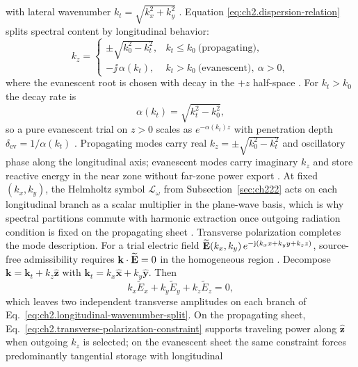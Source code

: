 with lateral wavenumber \(k_t=\sqrt{k_x^2+k_y^2}\) \cite{stratton1941}. Equation
\eqref{eq:ch2.dispersion-relation} splits spectral content by longitudinal behavior:
\begin{equation}
\label{eq:ch2.longitudinal-wavenumber-split}
k_z=
\begin{cases}
\pm\sqrt{k_0^2-k_t^2}, & k_t\le k_0\ \text{(propagating)},\\[4pt]
-\jj\,\alpha(k_t), & k_t>k_0\ \text{(evanescent)},\ \alpha>0,
\end{cases}
\end{equation}
where the evanescent root is chosen with decay in the \(+z\) half-space
\cite{stratton1941}. For \(k_t>k_0\) the decay rate is
\begin{equation}
\label{eq:ch2.evanescent-decay-rate}
\alpha(k_t)=\sqrt{k_t^2-k_0^2},
\end{equation}
so a pure evanescent trial on \(z>0\) scales as
\(e^{-\alpha(k_t)z}\) with penetration depth \(\delta_{\mathrm{ev}}=1/\alpha(k_t)\)
\cite{stratton1941}. Propagating modes carry real \(k_z=\pm\sqrt{k_0^2-k_t^2}\) and
oscillatory phase along the longitudinal axis; evanescent modes carry imaginary
\(k_z\) and store reactive energy in the near zone without far-zone power export
\cite{harrington2001}. At fixed \((k_x,k_y)\), the Helmholtz symbol
\(\mathcal{L}_\omega\) from Subsection~\ref{sec:ch222} acts on each longitudinal
branch as a scalar multiplier in the plane-wave basis, which is why spectral
partitions commute with harmonic extraction once outgoing radiation condition is fixed on the
propagating sheet \cite{stratton1941}.
Transverse polarization completes the mode description. For a trial electric field
\(\widetilde{\mathbf{E}}(k_x,k_y)\,e^{-\mathrm{j}(k_x x+k_y y+k_z z)}\), source-free admissibility
requires \(\mathbf{k}\cdot\widetilde{\mathbf{E}}=0\) in the homogeneous region
\cite{stratton1941}. Decompose \(\mathbf{k}=\mathbf{k}_t+k_z\hat{\mathbf{z}}\)
with \(\mathbf{k}_t=k_x\hat{\mathbf{x}}+k_y\hat{\mathbf{y}}\). Then
\begin{equation}
\label{eq:ch2.transverse-polarization-constraint}
k_x\widetilde{E}_x+k_y\widetilde{E}_y+k_z\widetilde{E}_z=0,
\end{equation}
which leaves two independent transverse amplitudes on each branch of
Eq.~\eqref{eq:ch2.longitudinal-wavenumber-split}. On the propagating sheet,
Eq.~\eqref{eq:ch2.transverse-polarization-constraint} supports traveling power
along \(\hat{\mathbf{z}}\) when outgoing \(k_z\) is selected; on the evanescent sheet
the same constraint forces predominantly tangential storage with longitudinal
